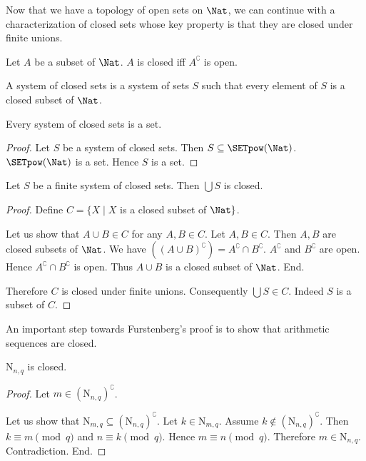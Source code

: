 \documentclass{article}
\newcommand{\N}{\mathrm{N}}
\begin{document}
  Now that we have a topology of open sets on $\Nat$, we can continue
  with a characterization of closed sets whose key property is that they are
  closed under finite unions.

  \begin{forthel}
    \begin{definition}
      Let $A$ be a subset of $\Nat$.
      $A$ is closed iff $A^\complement$ is open.
    \end{definition}

    \begin{definition}
      A system of closed sets is a system of sets $S$ such that every element of
      $S$ is a closed subset of $\Nat$.
    \end{definition}

    \begin{lemma}
      Every system of closed sets is a set.
    \end{lemma}
    \begin{proof}
      Let $S$ be a system of closed sets.
      Then $S \subseteq \SETpow(\Nat)$.
      $\SETpow(\Nat)$ is a set.
      Hence $S$ is a set.
    \end{proof}

    \begin{lemma}
      Let $S$ be a finite system of closed sets.
      Then $\bigcup S$ is closed.
    \end{lemma}
    \begin{proof}
      Define $C = \{ X \mid X$ is a closed subset of $\Nat \}$.

      Let us show that $A \cup B \in C$ for any $A, B \in C$.
        Let $A, B \in C$.
        Then $A, B$ are closed subsets of $\Nat$.
        We have $((A \cup B)^\complement) = A^\complement \cap B^\complement$. %
        $A^\complement$ and $B^\complement$ are open.
        Hence $A^\complement \cap B^\complement$ is open.
        Thus $A \cup B$ is a closed subset of $\Nat$.
      End.

      Therefore $C$ is closed under finite unions.
      Consequently $\bigcup S \in C$.
      Indeed $S$ is a subset of $C$.
    \end{proof}
  \end{forthel}

  An important step towards Furstenberg's proof is to show that arithmetic
  sequences are closed.

  \begin{forthel}
    \begin{lemma}
      $\N_{n, q}$ is closed.
    \end{lemma}
    \begin{proof}
      Let $m \in (\N_{n, q})^\complement$.

      Let us show that $\N_{m, q} \subseteq (\N_{n, q})^\complement$.
        Let $k \in \N_{m, q}$.
        Assume $k \notin (\N_{n, q})^\complement$.
        Then $k \equiv m \pmod{q}$ and $n \equiv k \pmod{q}$.
        Hence $m \equiv n \pmod{q}$.
        Therefore $m \in \N_{n, q}$.
        Contradiction.
      End.
    \end{proof}
  \end{forthel}
\end{document}
